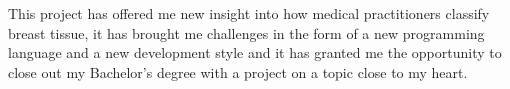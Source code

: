  This project has offered me new insight into how medical practitioners classify breast tissue, it has brought me challenges in the form of a new programming language and a new development style and it has granted me the opportunity to close out my Bachelor's degree with a project on a topic close to my heart.
